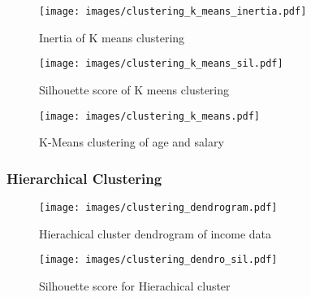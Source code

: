 \begin{figure}[H]
    \centering
    \texttt{[image: images/clustering\_k\_means\_inertia.pdf]} %
    \caption{Inertia of K means clustering}
    \label{fig:inertia of k means clustering}
\end{figure}

\begin{figure}[H]
    \centering
    \texttt{[image: images/clustering\_k\_means\_sil.pdf]} %
    \caption{Silhouette score of K meens clustering}
    \label{fig:silhouette of k means clustering}
\end{figure}

\begin{figure}[H]
    \centering
    \texttt{[image: images/clustering\_k\_means.pdf]} %
    \caption{K-Means clustering of age and salary}
    \label{fig:kMeans clustering of age and salary}
\end{figure}

\subsubsection{Hierarchical Clustering}

\begin{figure}[H]
    \centering
    \texttt{[image: images/clustering\_dendrogram.pdf]} %
    \caption{Hierachical cluster dendrogram of income data}
    \label{fig:Hierachical cluster dendrogram of income data}
\end{figure}

\begin{figure}[H]
    \centering
    \texttt{[image: images/clustering\_dendro\_sil.pdf]} %
    \caption{Silhouette score for Hierachical cluster}
    \label{fig:Hierachical cluster silhouette score}
\end{figure}